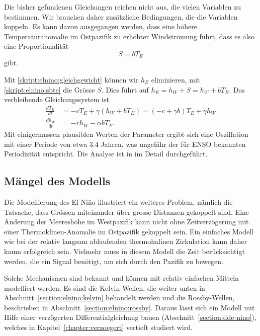 Die bisher gefundenen Gleichungen reichen nicht aus, die vielen Variablen
zu bestimmen.
Wir brauchen daher zusätzliche Bedingungen, die die Variablen koppeln.
Es kann davon ausgegangen werden, dass eine höhere Temperaturanomalie
im Ostpazifik zu erhöhter Windströmung führt, dass es also eine
Proportionalität 
\begin{equation}
S=bT_E
\label{skript:elnino:sbte}
\end{equation}
gibt.

Mit \eqref{skript:elnino:gleichgewicht} können wir $h_E$ eliminieren,
mit \eqref{skript:elnino:sbte} die Grösse $S$.
Dies führt auf $h_E=h_W+S=h_W+bT_E$.
Das verbleibende Gleichungssystem ist
\begin{align*}
\frac{dT_E}{dt}
&=
-cT_E + \gamma(h_W+bT_E)
=
(-c+\gamma b)T_E
+
\gamma h_W
\\
\frac{dh_W}{dt}
&=
-rh_W - \alpha b T_E.
\end{align*}
Mit einigermassen plausiblen Werten der Parameter ergibt sich eine
Oszillation mit einer Periode von etwa $3.4$ Jahren, was ungefähr der
für ENSO bekannten Periodizität entspricht.
Die Analyse ist in \cite{skript:kaperengler} im Detail durchgeführt.


\subsection{Mängel des Modells\label{subsection:maengel des modells}}
Die Modellierung des El Niño illustriert ein weiteres Problem, nämlich
die Tatsache, dass Grössen miteinander über grosse Distanzen gekoppelt
sind.
Eine Änderung der Meereshöhe im Westpazifik kann nicht ohne Zeitverzögerung
mit einer Thermoklinen-Anomalie im Ostpazifik gekoppelt sein.
Ein einfaches Modell wie bei der relativ langsam ablaufenden thermohalinen
Zirkulation kann daher kaum erfolgreich sein.
Vielmehr muss in diesem Modell die Zeit berücksichtigt werden, die ein
Signal benötigt, um sich durch den Pazifik zu bewegen.

Solche Mechanismen sind bekannt und können mit relativ einfachen
Mitteln modelliert werden.
Es sind die Kelvin-Wellen, die weiter unten in
Abschnitt~\ref{section:elnino:kelvin}
behandelt werden und die Rossby-Wellen, beschrieben in
Abschnitt~\ref{section:elnino:rossby}.
Daraus lässt sich ein Modell mit Hilfe einer verzögerten Differentialgleichung
bauen (Abschnitt~\ref{section:dde-nino}), welches in
Kapitel~\ref{chapter:verzoegert} vertieft studiert wird.


